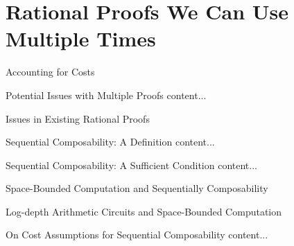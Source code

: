 \section{Rational Proofs We Can Use Multiple Times}

\begin{frame}{Accounting for Costs}

\end{frame}

\begin{frame}{Potential Issues with Multiple Proofs}
	content...
\end{frame}

\begin{frame}{Issues in Existing Rational Proofs}
\end{frame}

\begin{frame}{Sequential Composability: A Definition}
	content...
\end{frame}

\begin{frame}{Sequential Composability: A Sufficient Condition}
	content...
\end{frame}

\begin{frame}{Space-Bounded Computation and Sequentially Composability}
\end{frame}

\begin{frame}{Log-depth Arithmetic Circuits and Space-Bounded Computation}
\end{frame}

\begin{frame}{On Cost Assumptions for Sequential Composability}
	content...
\end{frame}